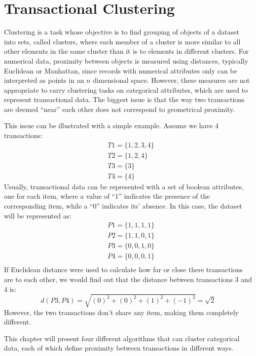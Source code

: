 \chapter{Transactional Clustering}

Clustering is a task whose objective is to find grouping of objects of a dataset into sets, called clusters, where each member of a cluster is more similar to all other elements in the same cluster than it is to elements in different clusters. For numerical data, proximity between objects is measured using distances, typically Euclidean or Manhattan, since records with numerical attributes only can be interpreted as points in an $n$ dimensional space. However, these measures are not appropriate to carry clustering tasks on categorical attributes, which are used to represent transactional data. The biggest issue is that the way two transactions are deemed ``near'' each other does not correspond to geometrical proximity.

This issue can be illustrated with a simple example. Assume we have 4 transactions:
\begin{align*}
    &T1 = \{1,2,3,4\} \\
    &T2 = \{1,2,4\} \\
    &T3 = \{3\} \\
    &T4 = \{4\}
\end{align*}
Usually, transactional data can be represented with a set of boolean attributes, one for each item, where a value of ``1'' indicates the presence of the corresponding item, while a ``0'' indicates its' absence. In this case, the dataset will be represented as:
\begin{align*}
    &P1 = \{1,1,1,1\} \\
    &P2 = \{1,1,0,1\} \\
    &P3 = \{0,0,1,0\} \\
    &P4 = \{0,0,0,1\} \\
\end{align*}
If Euclidean distance were used to calculate how far or close there transactions are to each other, we would find out that the distance between transactions 3 and 4 is:
\begin{equation*}
    d(P3, P4) = \sqrt{(0)^2 + (0)^2 + (1)^2 + (-1)^2} = \sqrt{2}    
\end{equation*}
However, the two transactions don't share any item, making them completely different.

This chapter will present four different algorithms that can cluster categorical data, each of which define proximity between transactions in different ways.

